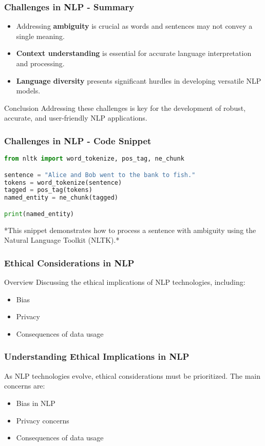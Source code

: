 \documentclass[aspectratio=169]{beamer}
\begin{document}
\begin{frame}[fragile]
    \frametitle{Challenges in NLP - Summary}
    \begin{itemize}
        \item Addressing \textbf{ambiguity} is crucial as words and sentences may not convey a single meaning.
        \item \textbf{Context understanding} is essential for accurate language interpretation and processing.
        \item \textbf{Language diversity} presents significant hurdles in developing versatile NLP models.
    \end{itemize}
    
    \begin{block}{Conclusion}
        Addressing these challenges is key for the development of robust, accurate, and user-friendly NLP applications.
    \end{block}
\end{frame}

\begin{frame}[fragile]
    \frametitle{Challenges in NLP - Code Snippet}
    \begin{lstlisting}[language=Python]
from nltk import word_tokenize, pos_tag, ne_chunk

sentence = "Alice and Bob went to the bank to fish."
tokens = word_tokenize(sentence)
tagged = pos_tag(tokens)
named_entity = ne_chunk(tagged)

print(named_entity)
    \end{lstlisting}
    *This snippet demonstrates how to process a sentence with ambiguity using the Natural Language Toolkit (NLTK).*
\end{frame}

\begin{frame}[fragile]
    \frametitle{Ethical Considerations in NLP}
    \begin{block}{Overview}
        Discussing the ethical implications of NLP technologies, including:
        \begin{itemize}
            \item Bias
            \item Privacy
            \item Consequences of data usage
        \end{itemize}
    \end{block}
\end{frame}

\begin{frame}[fragile]
    \frametitle{Understanding Ethical Implications in NLP}
    As NLP technologies evolve, ethical considerations must be prioritized. The main concerns are:
    \begin{itemize}
        \item Bias in NLP
        \item Privacy concerns
        \item Consequences of data usage
    \end{itemize}
\end{frame}
\end{document}
